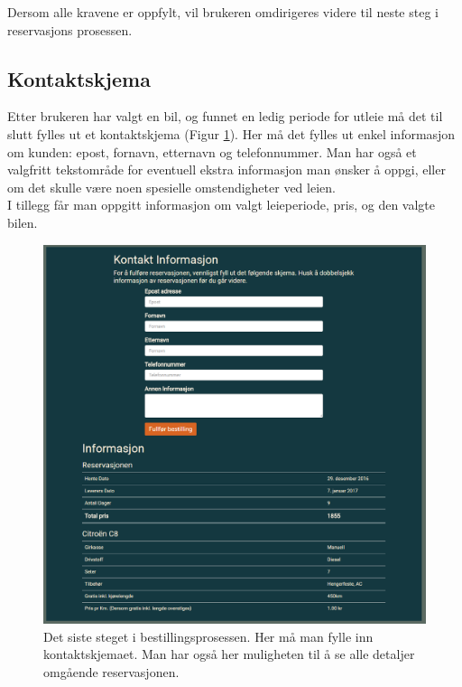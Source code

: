 Dersom alle kravene er oppfylt, vil brukeren omdirigeres videre til neste steg i reservasjons prosessen.




\subsection{Kontaktskjema}
Etter brukeren har valgt en bil, og funnet en ledig periode for utleie må det til slutt fylles ut et kontaktskjema (Figur \ref{fig:rv_customercontact}). Her må det fylles ut enkel informasjon om kunden: epost, fornavn, etternavn og telefonnummer. Man har også et valgfritt tekstområde for eventuell ekstra informasjon man ønsker å oppgi, eller om det skulle være noen spesielle omstendigheter ved leien.
\\
I tillegg får man oppgitt informasjon om valgt leieperiode, pris, og den valgte bilen. 

 \begin{figure}[htbp]
	\centering
		\includegraphics[scale=0.5]{Bilder/rv_customercontact.png}
	\caption[Kontaktskjema]{Det siste steget i bestillingsprosessen. Her må man fylle inn kontaktskjemaet. Man har også her muligheten til å se alle detaljer omgående reservasjonen.} %
	\label{fig:rv_customercontact}
\end{figure}


